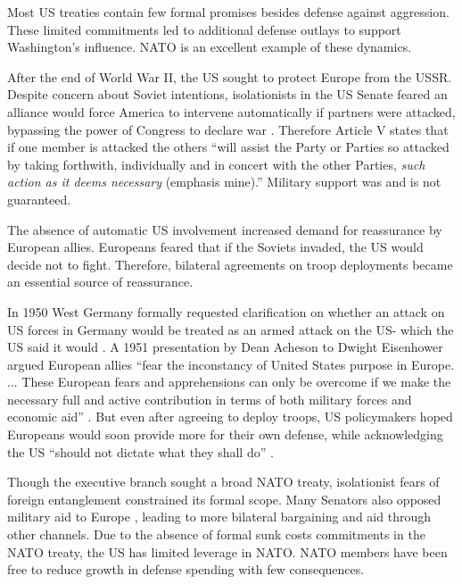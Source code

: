 \documentclass[12pt]{article}
\begin{document}
Most US treaties contain few formal promises besides defense against aggression. 
These limited commitments led to additional defense outlays to support Washington's influence.  
NATO is an excellent example of these dynamics. 


After the end of World War II, the US sought to protect Europe from the USSR. 
Despite concern about Soviet intentions, isolationists in the US Senate feared an alliance would force America to intervene automatically if partners were attacked, bypassing the power of Congress to declare war \citep[pg. 280-1]{Acheson1969}.
Therefore Article V states that if one member is attacked the others ``will assist the Party or Parties so attacked by taking forthwith, individually and in concert with the other Parties, \emph{such action as it deems necessary} (emphasis mine).'' 
Military support was and is not guaranteed. 


The absence of automatic US involvement increased demand for reassurance by European allies. 
Europeans feared that if the Soviets invaded, the US would decide not to fight. 
Therefore, bilateral agreements on troop deployments became an essential source of reassurance. 


In 1950 West Germany formally requested clarification on whether an attack on US forces in Germany would be treated as an armed attack on the US- which the US said it would \citep[pg. 395]{Acheson1969}. 
A 1951 presentation by Dean Acheson to Dwight Eisenhower argued European allies ``fear the inconstancy of United States purpose in Europe. ... These European fears and apprehensions can only be overcome if we make the necessary full and active contribution in terms of both military forces and economic aid'' \citep[pg. 3]{Acheson1951}.  
But even after agreeing to deploy troops, US policymakers hoped Europeans would soon provide more for their own defense, while acknowledging the US ``should not dictate what they shall do'' \citep[pg. 2]{Johnson1950}. 


Though the executive branch sought a broad NATO treaty, isolationist fears of foreign entanglement constrained its formal scope. 
Many Senators also opposed military aid to Europe \citep[pg 285]{Acheson1969}, leading to more bilateral bargaining and aid through other channels. 
Due to the absence of formal sunk costs commitments in the NATO treaty, the US has limited leverage in NATO. 
NATO members have been free to reduce growth in defense spending with few consequences. 
\end{document}
